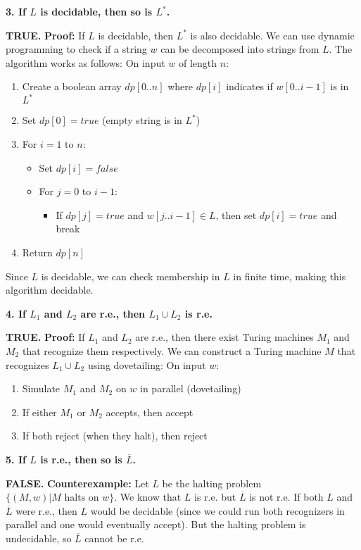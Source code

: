\documentclass{article}
\begin{document}
\textbf{3. If $L$ is decidable, then so is $L^*$.}

\textbf{TRUE.}
\textbf{Proof:} If $L$ is decidable, then $L^*$ is also decidable. We can use dynamic programming to check if a string $w$ can be decomposed into strings from $L$. The algorithm works as follows:
On input $w$ of length $n$:
\begin{enumerate}
\item Create a boolean array $dp[0..n]$ where $dp[i]$ indicates if $w[0..i-1]$ is in $L^*$
\item Set $dp[0] = true$ (empty string is in $L^*$)
\item For $i = 1$ to $n$:
   \begin{itemize}
   \item Set $dp[i] = false$
   \item For $j = 0$ to $i-1$:
     \begin{itemize}
     \item If $dp[j] = true$ and $w[j..i-1] \in L$, then set $dp[i] = true$ and break
     \end{itemize}
   \end{itemize}
\item Return $dp[n]$
\end{enumerate}
Since $L$ is decidable, we can check membership in $L$ in finite time, making this algorithm decidable.

\textbf{4. If $L_1$ and $L_2$ are r.e., then $L_1 \cup L_2$ is r.e.}

\textbf{TRUE.}
\textbf{Proof:} If $L_1$ and $L_2$ are r.e., then there exist Turing machines $M_1$ and $M_2$ that recognize them respectively. We can construct a Turing machine $M$ that recognizes $L_1 \cup L_2$ using dovetailing:
On input $w$:
\begin{enumerate}
\item Simulate $M_1$ and $M_2$ on $w$ in parallel (dovetailing)
\item If either $M_1$ or $M_2$ accepts, then accept
\item If both reject (when they halt), then reject
\end{enumerate}

\textbf{5. If $L$ is r.e., then so is $\overline{L}$.}

\textbf{FALSE.}
\textbf{Counterexample:} Let $L$ be the halting problem $\{(M,w) | M \text{ halts on } w\}$. We know that $L$ is r.e. but $\overline{L}$ is not r.e. If both $L$ and $\overline{L}$ were r.e., then $L$ would be decidable (since we could run both recognizers in parallel and one would eventually accept). But the halting problem is undecidable, so $\overline{L}$ cannot be r.e.
\end{document}
